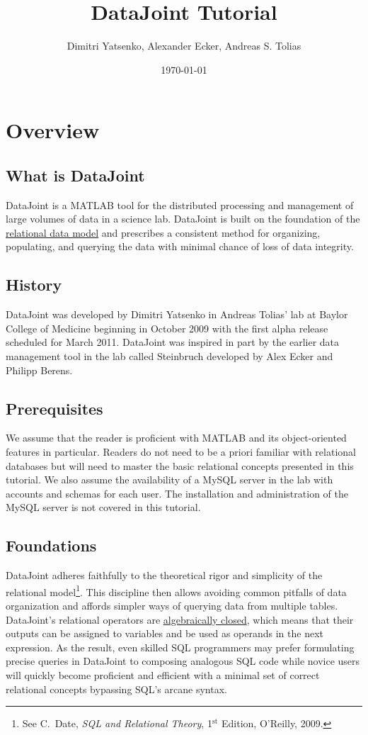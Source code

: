 \documentclass[10pt]{article}
\title{DataJoint Tutorial}
\date{\today} %
\author{Dimitri Yatsenko, Alexander Ecker, Andreas S. Tolias}
\begin{document}
\maketitle
\tableofcontents
\newpage
\section{Overview}
\subsection{What is DataJoint}
DataJoint is a MATLAB tool for the distributed processing and management of large volumes of data in a science lab.  DataJoint is built on the foundation of the \href{http://en.wikipedia.org/wiki/Relational_model}{relational data model} and prescribes a consistent method for organizing, populating, and querying the data with minimal chance of loss of data integrity.

\subsection{History}
DataJoint was developed by Dimitri Yatsenko in Andreas Tolias' lab at Baylor College of Medicine beginning in October 2009 with the first alpha release scheduled for March 2011. DataJoint was inspired in part by the earlier data management tool in the lab called Steinbruch developed by Alex Ecker and Philipp Berens.

\subsection{Prerequisites}
We assume that the reader is proficient with MATLAB and its object-oriented features in particular.  Readers do not need to be a priori familiar with relational databases but will need to master the basic relational concepts presented in this tutorial. We also assume the availability of a MySQL server in the lab with accounts and schemas for each user. The installation and administration of the MySQL server is not covered in this tutorial.

\subsection{Foundations}
DataJoint adheres faithfully to the theoretical rigor and simplicity of the relational model\footnote{See C.~Date, {\em SQL and Relational Theory}, 1$^{\textrm{st}}$ Edition, O'Reilly, 2009.}. This discipline then allows avoiding common pitfalls of data organization and affords simpler ways of querying data from multiple tables.   DataJoint's relational operators are \href{http://en.wikipedia.org/wiki/Algebraic_closure}{algebraically closed}, which means that their outputs can be assigned to variables and be used as operands in the next expression. As the result, even skilled SQL programmers may prefer formulating precise queries in DataJoint to composing analogous SQL code while novice users will quickly become proficient and efficient with a minimal set of correct relational concepts bypassing SQL's arcane syntax.
\end{document}
